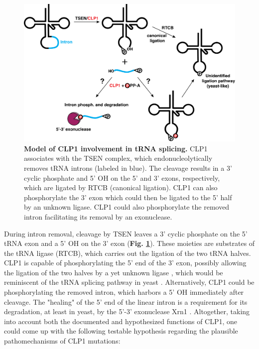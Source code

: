\documentclass[12pt]{rockefeller}
\begin{document}
\begin{figure}[!ht]%
\centering
\includegraphics[width=\textwidth]{splicing2_v2.png}%
\caption[Model of CLP1 involvement in tRNA splicing.]
{\textbf{Model of CLP1 involvement in tRNA splicing.}
CLP1 associates with the TSEN complex, which endonucleolytically removes tRNA introns (labeled in blue). The cleavage results in a 3' cyclic phosphate and 5' OH on the 5' and 3' exons, respectively, which are ligated by RTCB (canonical ligation). CLP1 can also phosphorylate the 3' exon which could then be ligated to the 5' half by an unknown ligase. CLP1 could also phosphorylate the removed intron facilitating its removal by an exonuclease.}
\centering
\label{splicing}%
\end{figure}

	During intron removal, cleavage by \gls{TSEN} leaves a 3' cyclic phosphate on the 5' tRNA exon and a 5' OH on the 3' exon (\textbf{Fig. \ref{splicing}}). These moieties are substrates of the tRNA ligase (RTCB), which carries out the ligation of the two tRNA halves. CLP1 is capable of phosphorylating the 5' end of the 3' exon, possibly allowing the ligation of the two halves by a yet unknown ligase \cite{Weitzer:2007hda}, which would be reminiscent of the tRNA splicing pathway in yeast \cite{Weitzer:2014bi}. 
	Alternatively, CLP1 could be phosphorylating the removed intron, which harbors a 5' OH immediately after cleavage. The "healing" of the 5' end of the linear intron is a requirement for its degradation, at least in yeast, by the 5'-3' exonuclease Xrn1 \cite{Wu:2014fb}.
	Altogether, taking into account both the documented and hypothesized functions of CLP1, one could come up with the following testable hypothesis regarding the plausible pathomechanisms of CLP1 mutations:
	
\end{document}
